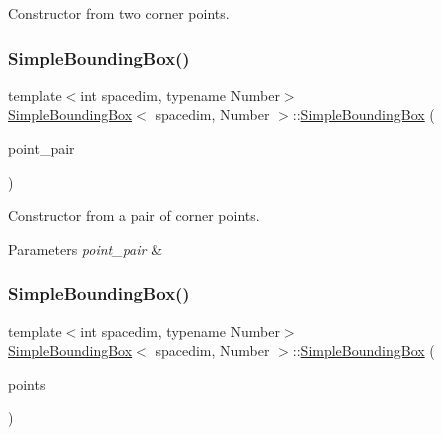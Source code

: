Constructor from two corner points. \mbox{\label{classSimpleBoundingBox_a75acd8fd3479b814c7e146d6948c1366}} 
\subsubsection{\texorpdfstring{Simple\+Bounding\+Box()}{SimpleBoundingBox()}\hspace{0.1cm}{\footnotesize\ttfamily [3/7]}}
{\footnotesize\ttfamily template$<$int spacedim, typename Number$>$ \\
\hyperlink{classSimpleBoundingBox}{Simple\+Bounding\+Box}$<$ spacedim, Number $>$\+::\hyperlink{classSimpleBoundingBox}{Simple\+Bounding\+Box} (\begin{DoxyParamCaption}\item[{const std\+::pair$<$ Point$<$ spacedim, Number $>$, Point$<$ spacedim, Number $>$$>$ \&}]{point\+\_\+pair }\end{DoxyParamCaption})}

Constructor from a pair of corner points. 
\begin{DoxyParams}{Parameters}
{\em point\+\_\+pair} & \\
\hline
\end{DoxyParams}
\mbox{\label{classSimpleBoundingBox_a4762c89a859a0040438b2f6b44defc79}} 
\subsubsection{\texorpdfstring{Simple\+Bounding\+Box()}{SimpleBoundingBox()}\hspace{0.1cm}{\footnotesize\ttfamily [4/7]}}
{\footnotesize\ttfamily template$<$int spacedim, typename Number$>$ \\
\hyperlink{classSimpleBoundingBox}{Simple\+Bounding\+Box}$<$ spacedim, Number $>$\+::\hyperlink{classSimpleBoundingBox}{Simple\+Bounding\+Box} (\begin{DoxyParamCaption}\item[{const std\+::vector$<$ Point$<$ spacedim, Number $>$$>$ \&}]{points }\end{DoxyParamCaption})}

